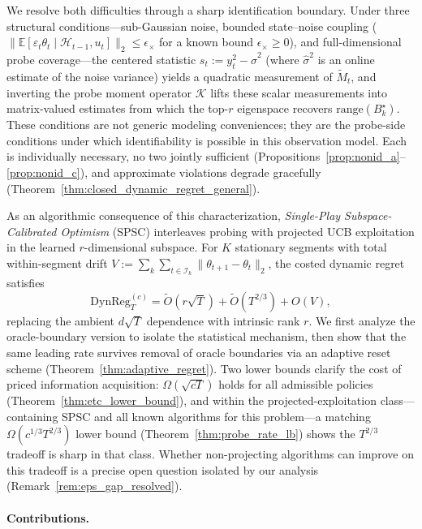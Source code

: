 \documentclass{article}
\newcommand{\E}{\mathbb{E}}
\newcommand{\cH}{\mathcal{H}}
\newcommand{\cI}{\mathcal{I}}
\newcommand{\DynReg}{\mathrm{DynReg}}
\newcommand{\range}{\mathrm{range}}
\begin{document}
  We resolve both difficulties through a sharp identification boundary. Under three structural
  conditions---sub-Gaussian noise, bounded state--noise coupling
  ($\|\E[\varepsilon_t\theta_t \mid \cH_{t-1}, u_t]\|_2 \le
  \epsilon_\times$ for a known bound $\epsilon_\times \ge 0$), and
  full-dimensional probe coverage---the centered statistic
  $s_t := y_t^2 - \hat\sigma^2$ (where $\hat\sigma^2$ is an online
  estimate of the noise variance) yields a quadratic measurement of
  $\widetilde{M}_t$, and inverting the probe moment operator
  $\mathcal{K}$ lifts these scalar measurements into matrix-valued
  estimates from which the top-$r$ eigenspace recovers
  $\range(B_k^\star)$. These conditions are not generic modeling
  conveniences; they are the probe-side conditions under which
  identifiability is possible in this observation model.
  Each is individually necessary, no two jointly sufficient
  (Propositions~\ref{prop:nonid_a}--\ref{prop:nonid_c}), and
  approximate violations degrade gracefully
  (Theorem~\ref{thm:closed_dynamic_regret_general}).

  As an algorithmic consequence of this characterization, \emph{Single-Play Subspace-Calibrated Optimism} (SPSC) interleaves probing with
  projected UCB exploitation in the learned $r$-dimensional subspace.
  For $K$ stationary segments with total within-segment drift
  $V := \sum_k \sum_{t \in \cI_k} \|\theta_{t+1} - \theta_t\|_2$,
  the costed dynamic regret satisfies
  \[
  \DynReg_T^{(c)} = \widetilde{O}(r\sqrt{T})
  + \widetilde{O}(T^{2/3}) + O(V),
  \]
  replacing the ambient $d\sqrt{T}$ dependence with intrinsic rank $r$.
  We first analyze the oracle-boundary version to isolate the statistical mechanism, then show that the same leading rate survives removal of oracle boundaries via an adaptive reset scheme (Theorem~\ref{thm:adaptive_regret}).
  Two lower bounds clarify the cost of priced information acquisition:
  $\Omega(\sqrt{cT})$ holds for all admissible policies (Theorem~\ref{thm:etc_lower_bound}), and within the projected-exploitation class---containing SPSC and all known algorithms for this problem---a matching $\Omega(c^{1/3}T^{2/3})$ lower bound
  (Theorem~\ref{thm:probe_rate_lb}) shows the $T^{2/3}$ tradeoff is sharp in that class.
  Whether non-projecting algorithms can improve on this tradeoff is a precise open question isolated by our analysis
  (Remark~\ref{rem:eps_gap_resolved}).

  \paragraph{Contributions.}
\end{document}
